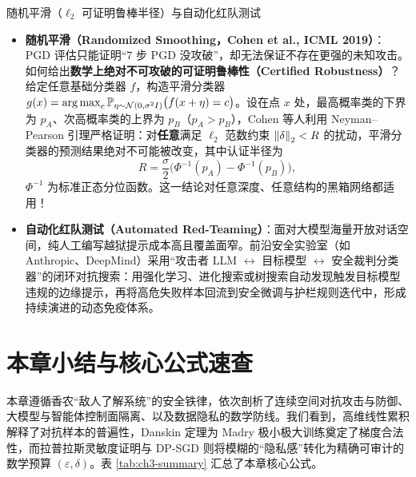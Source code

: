 \begin{extBox}{随机平滑（$\ell_2$ 可证明鲁棒半径）与自动化红队测试}
\begin{itemize}
  \item \textbf{随机平滑（Randomized Smoothing，Cohen et al., ICML 2019）}：PGD 评估只能证明“$7$ 步 PGD 没攻破”，却无法保证不存在更强的未知攻击。如何给出\textbf{数学上绝对不可攻破的可证明鲁棒性（Certified Robustness）}？给定任意基础分类器 $f$，构造平滑分类器 $g(x) = \operatorname*{arg\,max}_{c} \mathbb{P}_{\eta \sim \mathcal{N}(0, \sigma^2 I)}\big(f(x + \eta) = c\big)$。设在点 $x$ 处，最高概率类的下界为 $p_A$、次高概率类的上界为 $p_B$（$p_A > p_B$），Cohen 等人利用 Neyman--Pearson 引理严格证明：对\textbf{任意}满足 $\ell_2$ 范数约束 $\left\|\delta\right\|_2 < R$ 的扰动，平滑分类器的预测结果绝对不可能被改变，其中认证半径为
  \[
    R = \frac{\sigma}{2}\Big(\Phi^{-1}(p_A) - \Phi^{-1}(p_B)\Big),
  \]
  $\Phi^{-1}$ 为标准正态分位函数。这一结论对任意深度、任意结构的黑箱网络都适用！
  \item \textbf{自动化红队测试（Automated Red-Teaming）}：面对大模型海量开放对话空间，纯人工编写越狱提示成本高且覆盖面窄。前沿安全实验室（如 Anthropic、DeepMind）采用“攻击者 LLM $\leftrightarrow$ 目标模型 $\leftrightarrow$ 安全裁判分类器”的闭环对抗搜索：用强化学习、进化搜索或树搜索自动发现触发目标模型违规的边缘提示，再将高危失败样本回流到安全微调与护栏规则迭代中，形成持续演进的动态免疫体系。
\end{itemize}
\end{extBox}

\section{本章小结与核心公式速查}

本章遵循香农“敌人了解系统”的安全铁律，依次剖析了连续空间对抗攻击与防御、大模型与智能体控制面隔离、以及数据隐私的数学防线。我们看到，高维线性累积解释了对抗样本的普遍性，Danskin 定理为 Madry 极小极大训练奠定了梯度合法性，而拉普拉斯灵敏度证明与 DP-SGD 则将模糊的“隐私感”转化为精确可审计的数学预算 $(\varepsilon, \delta)$。表 \ref{tab:ch3-summary} 汇总了本章核心公式。

